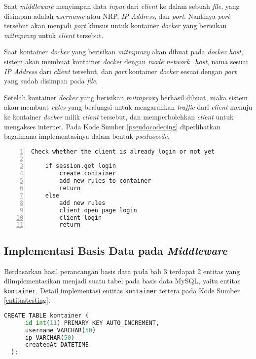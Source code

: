   Saat \textit{middleware} menyimpan data \textit{input} dari \textit{client} ke dalam sebuah \textit{file}, yang disimpan adalah \textit{username} atau NRP, \textit{IP Address}, dan \textit{port}. Nantinya \textit{port} tersebut akan menjadi \textit{port} khusus untuk kontainer \textit{docker} yang berisikan \textit{mitmproxy} untuk \textit{client} tersebut.
  
  Saat kontainer \textit{docker} yang berisikan \textit{mitmproxy} akan dibuat pada \textit{docker host}, sistem akan membuat kontainer \textit{docker} dengan \textit{mode network}=\textit{host}, nama sesuai \textit{IP Address} dari \textit{client} tersebut, dan \textit{port} kontainer \textit{docker} sesuai dengan \textit{port} yang sudah disimpan pada \textit{file}.
  
  Setelah kontainer \textit{docker} yang berisikan \textit{mitmproxy} berhasil dibuat, maka sistem akan membuat \textit{rules} yang berfungsi untuk mengarahkan \textit{traffic} dari \textit{client} menuju ke kontainer \textit{docker} milik \textit{client} tersebut, dan memperbolehkan \textit{client} untuk mengakses internet. Pada Kode Sumber \ref{pseudocodeoing} diperlihatkan bagaimana implementasinya dalam bentuk \textit{pseduocode}.
  \newline
  \begin{minipage}{\linewidth}  
  	\begin{lstlisting}[numbers=left, frame=single,tabsize=2,breaklines,caption={Pseudocode Web Service},label=pseudocodeoing]
  	Check whether the client is already login or not yet
  	
  	if session.get login
	  	create container
	  	add new rules to container
	  	return
  	else
	  	add new rules
	  	client open page login
	  	client login
	  	return  	
  	\end{lstlisting}
  \end{minipage}
  
  \subsection{Implementasi Basis Data pada \textit{Middleware}}
  Berdasarkan hasil perancangan basis data pada bab 3 terdapat 2 entitas yang diimplementasikan menjadi suatu tabel pada basis data MySQL, yaitu entitas \texttt{kontainer}. Detail implementasi entitas \texttt{kontainer} tertera pada Kode Sumber \ref{entitastesting}.
  \newline
  \begin{minipage}{\linewidth}
  \begin{lstlisting}[language=python, caption=\textit{Query} untuk membuat tabel testing,label=entitastesting]
  CREATE TABLE kontainer (
	  id int(11) PRIMARY KEY AUTO_INCREMENT,
	  username VARCHAR(50)
	  ip VARCHAR(50)
	  createdAt DATETIME
  );
  \end{lstlisting}
  \end{minipage}
    
